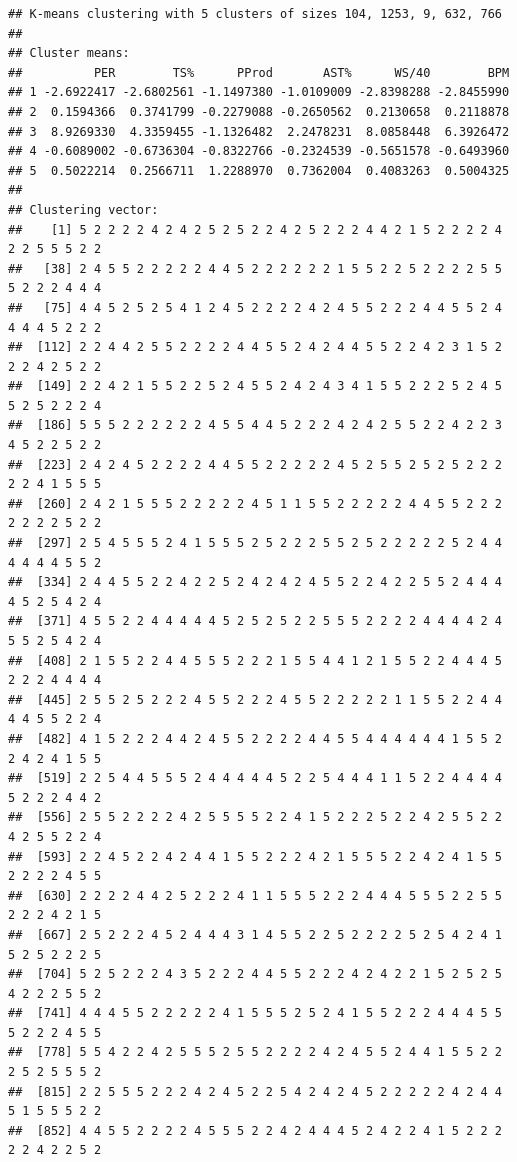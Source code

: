 \documentclass[
]{book}
\begin{document}
\begin{verbatim}
## K-means clustering with 5 clusters of sizes 104, 1253, 9, 632, 766
## 
## Cluster means:
##          PER        TS%      PProd       AST%      WS/40        BPM
## 1 -2.6922417 -2.6802561 -1.1497380 -1.0109009 -2.8398288 -2.8455990
## 2  0.1594366  0.3741799 -0.2279088 -0.2650562  0.2130658  0.2118878
## 3  8.9269330  4.3359455 -1.1326482  2.2478231  8.0858448  6.3926472
## 4 -0.6089002 -0.6736304 -0.8322766 -0.2324539 -0.5651578 -0.6493960
## 5  0.5022214  0.2566711  1.2288970  0.7362004  0.4083263  0.5004325
## 
## Clustering vector:
##    [1] 5 2 2 2 2 4 2 4 2 5 2 5 2 2 4 2 5 2 2 2 4 4 2 1 5 2 2 2 2 4 2 2 5 5 5 2 2
##   [38] 2 4 5 5 2 2 2 2 2 4 4 5 2 2 2 2 2 2 1 5 5 2 2 5 2 2 2 2 5 5 5 2 2 2 4 4 4
##   [75] 4 4 5 2 5 2 5 4 1 2 4 5 2 2 2 2 4 2 4 5 5 2 2 2 4 4 5 5 2 4 4 4 4 5 2 2 2
##  [112] 2 2 4 4 2 5 5 2 2 2 2 4 4 5 5 2 4 2 4 4 5 5 2 2 4 2 3 1 5 2 2 2 4 2 5 2 2
##  [149] 2 2 4 2 1 5 5 2 2 5 2 4 5 5 2 4 2 4 3 4 1 5 5 2 2 2 5 2 4 5 5 2 5 2 2 2 4
##  [186] 5 5 5 2 2 2 2 2 2 4 5 5 4 4 5 2 2 2 4 2 4 2 5 5 2 2 4 2 2 3 4 5 2 2 5 2 2
##  [223] 2 4 2 4 5 2 2 2 2 4 4 5 5 2 2 2 2 2 4 5 2 5 5 2 5 2 5 2 2 2 2 2 4 1 5 5 5
##  [260] 2 4 2 1 5 5 5 2 2 2 2 2 4 5 1 1 5 5 2 2 2 2 2 4 4 5 5 2 2 2 2 2 2 2 5 2 2
##  [297] 2 5 4 5 5 5 2 4 1 5 5 5 2 5 2 2 2 5 5 2 5 2 2 2 2 2 5 2 4 4 4 4 4 4 5 5 2
##  [334] 2 4 4 5 5 2 2 4 2 2 5 2 4 2 4 2 4 5 5 2 2 4 2 2 5 5 2 4 4 4 4 5 2 5 4 2 4
##  [371] 4 5 5 2 2 4 4 4 4 4 5 2 5 2 5 2 2 5 5 5 2 2 2 2 4 4 4 4 2 4 5 5 2 5 4 2 4
##  [408] 2 1 5 5 2 2 4 4 5 5 5 2 2 2 1 5 5 4 4 1 2 1 5 5 2 2 4 4 4 5 2 2 2 4 4 4 4
##  [445] 2 5 5 2 5 2 2 2 4 5 5 2 2 2 4 5 5 2 2 2 2 2 1 1 5 5 2 2 4 4 4 4 5 5 2 2 4
##  [482] 4 1 5 2 2 2 4 4 2 4 5 5 2 2 2 2 4 4 5 5 4 4 4 4 4 4 1 5 5 2 2 4 2 4 1 5 5
##  [519] 2 2 5 4 4 5 5 5 2 4 4 4 4 4 5 2 2 5 4 4 4 1 1 5 2 2 4 4 4 4 5 2 2 2 4 4 2
##  [556] 2 5 5 2 2 2 2 4 2 5 5 5 5 2 2 4 1 5 2 2 2 5 2 2 4 2 5 5 2 2 4 2 5 5 2 2 4
##  [593] 2 2 4 5 2 2 4 2 4 4 1 5 5 2 2 2 4 2 1 5 5 5 2 2 4 2 4 1 5 5 2 2 2 2 4 5 5
##  [630] 2 2 2 2 4 4 2 5 2 2 2 4 1 1 5 5 5 2 2 2 4 4 4 5 5 5 2 2 5 5 2 2 2 4 2 1 5
##  [667] 2 5 2 2 2 4 5 2 4 4 4 3 1 4 5 5 2 2 5 2 2 2 2 5 2 5 4 2 4 1 5 2 5 2 2 2 5
##  [704] 5 2 5 2 2 2 4 3 5 2 2 2 4 4 5 5 2 2 2 4 2 4 2 2 1 5 2 5 2 5 4 2 2 2 5 5 2
##  [741] 4 4 4 5 5 2 2 2 2 2 4 1 5 5 5 2 5 2 4 1 5 5 2 2 2 4 4 4 5 5 5 2 2 2 4 5 5
##  [778] 5 5 4 2 2 4 2 5 5 5 2 5 5 2 2 2 2 4 2 4 5 5 2 4 4 1 5 5 2 2 2 5 2 5 5 5 2
##  [815] 2 2 5 5 5 2 2 2 4 2 4 5 2 2 5 4 2 4 2 4 5 2 2 2 2 2 4 2 4 4 5 1 5 5 5 2 2
##  [852] 4 4 5 5 2 2 2 2 4 5 5 5 2 2 4 2 4 4 4 5 2 4 2 2 4 1 5 2 2 2 2 2 4 2 2 5 2

\end{verbatim}
\end{document}
